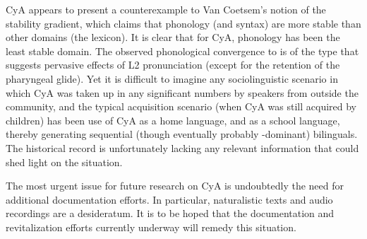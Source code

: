 \documentclass[output=paper]{langsci/langscibook}
\begin{document}
CyA appears to present a counterexample to Van Coetsem’s notion of the {stability gradient}, which claims that phonology (and syntax) are more stable than other domains (the lexicon). It is clear that for CyA, phonology has been the least stable domain. The observed phonological {convergence} to  is of the type that suggests pervasive effects of L2 pronunciation (except for the retention of the {pharyngeal} glide). Yet it is difficult to imagine any sociolinguistic scenario in which CyA was taken up in any significant numbers by  speakers from outside the community, and the typical acquisition scenario (when CyA was still acquired by children) has been use of CyA as a home language, and  as a school language, thereby generating sequential (though eventually probably -dominant) bilinguals. The historical record is unfortunately lacking any relevant information that could shed light on the situation.

The most urgent issue for {future} research on CyA is undoubtedly the need for additional documentation efforts. In particular, naturalistic texts and audio recordings are a desideratum. It is to be hoped that the documentation and revitalization efforts currently underway will remedy this situation.
\end{document}

